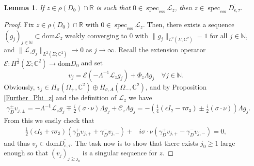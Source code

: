 \documentclass[11pt,a4paper,reqno,oneside]{amsproc}
\DeclareMathOperator{\dom}{dom}
\DeclareMathOperator{\spec}{spec}
\newcommand{\spece}{\spec_\mathrm{ess}}
\def \rr {{\mathbb R}}
\def \cc {{\mathbb C}}
\def \nn {{\mathbb N}}
\numberwithin{equation}{section}
\def\dom{\mathrm{dom}}
\def \cc {{\mathbb{C}}}
\newtheorem{lemma}[definition]{Lemma}
\begin{document}
\begin{lemma}\label{L relate D} If $z\in \rho(D_0)\cap\rr$ is such that $0\in\spece \mathcal L_z$, then $z\in\spece  \overline{D_{\epsilon,\tau}}$.
\end{lemma}
\begin{proof} Fix $z\in \rho(D_0)\cap\rr$ with $0\in\spece \mathcal L_z$. Then, there exists a sequence $(g_j)_{j\in\nn}\subset \dom \mathcal L_z$ weakly converging to $0$ with $\|g_j\|_{L^2(\Sigma;\cc^2)}=1$ for all $j\in\nn$, and $\| \mathcal L_z g_j\|_{L^2(\Sigma;\cc^2)} \rightarrow 0$ as $j \rightarrow \infty$. 
Recall the extension operator $\mathcal E: H^{\frac{1}{2}}(\Sigma;\cc^2) \rightarrow \dom D_{0}$ and set 
\[
v_j= \mathcal{E}(-\Lambda^{-1}\mathcal L_z g_j)+ \Phi_z\Lambda g_j\quad \forall j\in\nn.
\]
Obviously, $v_j\in H_\sigma(\Omega_+,\cc^2)\oplus H_{\sigma, A}(\Omega_-,\cc^2)$, and by Proposition \ref{Further_Phi_z}  and the definition of $\mathcal L_z$ we have 
\begin{align*}
\gamma_D^\pm v_{j,\pm}= -\Lambda^{-1}\mathcal L_z g_j \mp\frac{i}{2}(\sigma\cdot\nu)\Lambda g_j + \mathscr C_z\Lambda g_j=  -(\frac{1}{4}(\epsilon I_2 - \tau\sigma_3) \pm\frac{i}{2}(\sigma\cdot\nu) ) \Lambda g_j.
\end{align*}
From this we easily check that 
\begin{align*}
\frac{1}{2}(\epsilon I_2+\tau\sigma_3)(\gamma_D^+ v_{j,+} +\gamma_D^- v_{j,-})+ &i\sigma\cdot\nu(\gamma_D^+ v_{j,+} -\gamma_D^- v_{j,-})= 0,
\end{align*}
and thus $v_j\in\dom  \overline{D_{\epsilon,\tau}}$. The task now is to show that there exists $j_0\geq 1$ large enough so that $(v_j)_{j\geq j_0}$ is a singular sequence for $z$. 


\end{proof}
\end{document}
